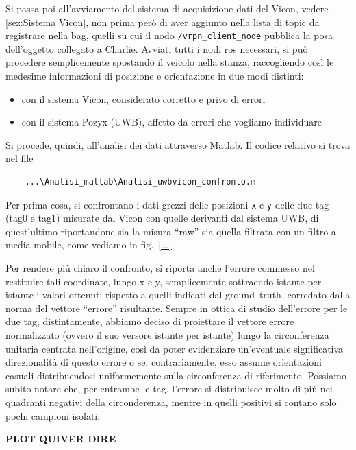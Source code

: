 Si passa poi all'avviamento del sistema di acquisizione dati del Vicon, vedere \ref{sez:Sistema Vicon}, non prima però di aver aggiunto nella lista di topic da registrare nella bag, quelli su cui il nodo \verb|/vrpn_client_node| pubblica la posa dell'oggetto collegato a Charlie. 
\vspace{0.5cm}
Avviati tutti i nodi ros necessari, si può procedere semplicemente spostando il veicolo nella stanza, raccogliendo così le medesime informazioni di posizione e orientazione in due modi distinti: 
\begin{itemize}
	\item con il sistema Vicon, considerato corretto e privo di errori
	\item con il sistema Pozyx (UWB), affetto da errori che vogliamo individuare
\end{itemize}

Si procede, quindi, all'analisi dei dati attraverso Matlab. Il codice relativo si trova nel file
\begin{verbatim}
	...\Analisi_matlab\Analisi_uwbvicon_confronto.m
\end{verbatim}  

Per prima cosa, si confrontano i dati grezzi delle posizioni \verb|x| e \verb|y| delle due tag (tag0 e tag1) misurate dal Vicon con quelle derivanti dal sistema UWB, di quest'ultimo 
riportandone sia la misura ``raw'' sia quella filtrata con un filtro a media mobile, come vediamo in fig.~\ref{...}.

Per rendere più chiaro il confronto, si riporta anche l'errore commesso nel restituire tali coordinate, lungo x e y, semplicemente sottraendo istante per istante i valori ottenuti rispetto a quelli indicati dal ground--truth, corredato dalla norma del vettore ``errore'' risultante.
Sempre in ottica di studio dell'errore per le due tag, distintamente, abbiamo deciso di proiettare il vettore errore normalizzato (ovvero il suo versore istante per istante) lungo la circonferenza unitaria centrata nell'origine, così da 
poter evidenziare un'eventuale significativa direzionalità di questo errore o se, contrariamente, esso assume orientazioni casuali distribuendosi uniformemente sulla 
circonferenza di riferimento. Possiamo subito notare che, per entrambe le tag, l'errore si distribuisce molto di più nei quadranti negativi della circonderenza,
mentre in quelli positivi si contano solo pochi campioni isolati.

\textbf{PLOT QUIVER DIRE}

